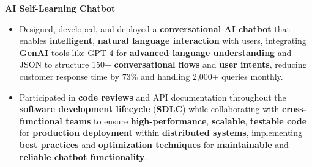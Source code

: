 \documentclass[a4paper,10pt]{article}
\begin{document}
\vspace{-2mm}
\textbf{AI Self-Learning Chatbot} \\
\begin{itemize}[leftmargin=*, itemsep=0pt, parsep=1pt]
\vspace{-7mm}
    \item Designed, developed, and deployed a \textbf{conversational AI chatbot} that enables \textbf{intelligent}, \textbf{natural language interaction} with users, integrating \textbf{GenAI} tools like GPT-4 for \textbf{advanced language understanding} and JSON to structure 150+ \textbf{conversational flows} and \textbf{user intents}, reducing customer response time by 73\% and handling 2,000+ queries monthly.
    \item Participated in \textbf{code reviews} and API documentation throughout the \textbf{software development lifecycle} (\textbf{SDLC}) while collaborating with \textbf{cross-functional teams} to ensure \textbf{high-performance}, \textbf{scalable}, \textbf{testable code} for \textbf{production deployment} within \textbf{distributed systems}, implementing \textbf{best practices} and \textbf{optimization techniques} for \textbf{maintainable} and \textbf{reliable chatbot functionality}.
\end{itemize}

\vspace{-2mm}
\end{document}
